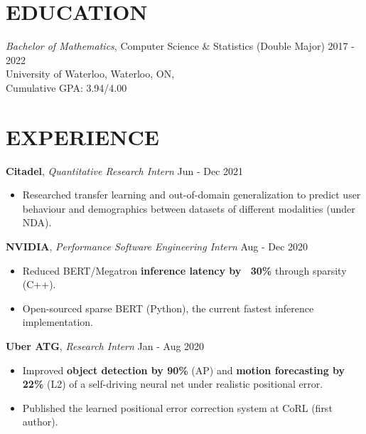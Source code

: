 \documentclass[line,margin]{res}
\newcommand{\experience}[3]{\textbf{#1}, \textit{#2} \hfill #3 \\ \vspace{-4mm}}
\begin{document}
\address{
    \href{mailto:nicholas.vadivelu@gmail.come}{nicholas.vadivelu@gmail.com} $\cdot$
    \href{https://nicholasvadivelu.com/}{nicholasvadivelu.com}
}

\begin{resume}
\vspace{-4mm}

\section{EDUCATION}
    \textit{Bachelor of Mathematics}, Computer Science \& Statistics (Double Major) \hfill 2017 - 2022 \\
    University of Waterloo, Waterloo, ON, \\
    Cumulative GPA: 3.94/4.00


\section{EXPERIENCE}
    \experience{Citadel}{Quantitative Research Intern}{Jun - Dec 2021}
    \begin{itemize}
        \item Researched transfer learning and out-of-domain generalization to predict user behaviour and demographics between datasets of different modalities (under NDA).
    \end{itemize}

    \experience{NVIDIA}{Performance Software Engineering Intern}{Aug - Dec 2020}
    \begin{itemize}
        \item Reduced BERT/Megatron \textbf{inference latency by ~30\%} through sparsity (C++).
        \item Open-sourced sparse BERT (Python), the current fastest inference implementation.
    \end{itemize}

    \experience{Uber ATG}{Research Intern}{Jan - Aug 2020}
    \begin{itemize}
        \item Improved \textbf{object detection by 90\%} (AP) and \textbf{motion forecasting by 22\%} (L2) of a self-driving neural net under realistic positional error.
        \item Published the learned positional error correction system at CoRL (first author).
    \end{itemize}


\end{resume}
\end{document}
